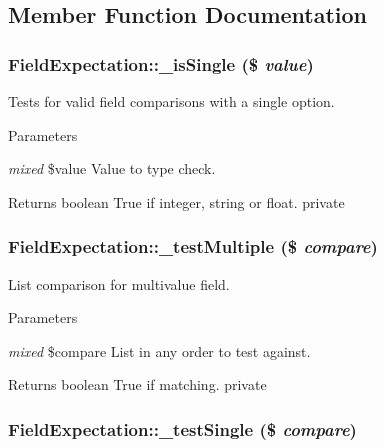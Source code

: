 \subsection{Member Function Documentation}
\hypertarget{class_field_expectation_a634084e075491c4c6dffa60beb8c0659}{
\subsubsection[{\_\-isSingle}]{\setlength{\rightskip}{0pt plus 5cm}FieldExpectation::\_\-isSingle (\$ {\em value})}}
\label{class_field_expectation_a634084e075491c4c6dffa60beb8c0659}
Tests for valid field comparisons with a single option. 
\begin{DoxyParams}{Parameters}
\item[{\em mixed}]\$value Value to type check. \end{DoxyParams}
\begin{DoxyReturn}{Returns}
boolean True if integer, string or float.  private 
\end{DoxyReturn}
\hypertarget{class_field_expectation_aefd7811a38a60fe675c445841cffdd8a}{
\subsubsection[{\_\-testMultiple}]{\setlength{\rightskip}{0pt plus 5cm}FieldExpectation::\_\-testMultiple (\$ {\em compare})}}
\label{class_field_expectation_aefd7811a38a60fe675c445841cffdd8a}
List comparison for multivalue field. 
\begin{DoxyParams}{Parameters}
\item[{\em mixed}]\$compare List in any order to test against. \end{DoxyParams}
\begin{DoxyReturn}{Returns}
boolean True if matching.  private 
\end{DoxyReturn}
\hypertarget{class_field_expectation_a4eef89d4a9de8a41a0981b3918523f5d}{
\subsubsection[{\_\-testSingle}]{\setlength{\rightskip}{0pt plus 5cm}FieldExpectation::\_\-testSingle (\$ {\em compare})}}
